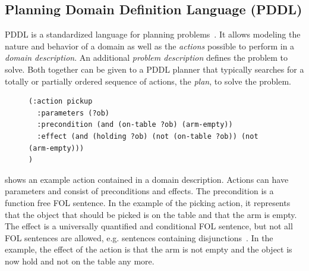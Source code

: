 \subsection{Planning Domain Definition Language (PDDL)}
PDDL is a standardized language for planning
problems~\cite{PDDL}. It allows modeling the nature and behavior of a
domain as well as the \emph{actions} possible to perform in a
\emph{domain description}. An additional \emph{problem description}
defines the problem to solve. Both together can be given to a PDDL
planner that typically searches for a totally or partially ordered
sequence of actions, the \emph{plan}, to solve the problem.
\begin{figure}
\begin{lstlisting}[showlines,style=ReallySmallCLIPS, caption={PDDL
      action to pick up an object from a table},
  label=lsf:pddl-action,
  emph={skill, args, state, target, res},
  emphstyle=\bfseries\color{green!80!black},
  emph={[2]\?skill, \$\?args, wait-for-lock, \?target, use,
  WAIT-FOR-LOCK, SKILL-EXECUTION, running},
  emphstyle={[2]\bfseries\color{blue!80!black}},
  morekeywords={action, parameters, precondition, effect}]
(:action pickup
  :parameters (?ob)
  :precondition (and (on-table ?ob) (arm-empty))
  :effect (and (holding ?ob) (not (on-table ?ob)) (not (arm-empty)))
)
\end{lstlisting}
\end{figure}
 shows an example action contained in a domain
description.  Actions can have parameters and consist of preconditions
and effects. The precondition is a function free FOL sentence. In the
example of the picking action, it represents that the object that
should be picked is on the table and that the arm is empty. The effect
is a universally quantified and conditional FOL sentence, but not all FOL
sentences are allowed, e.g. sentences containing disjunctions~\cite{PDDL}. In the
example, the effect of the action is that the arm is not empty and the
object is now hold and not on the table any more.

